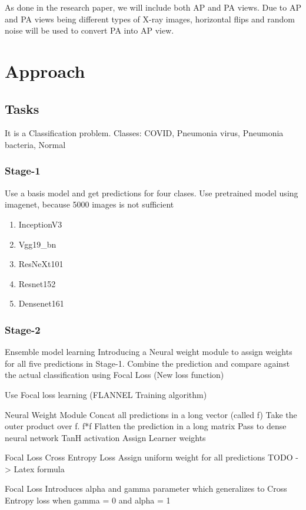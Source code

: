 \documentclass{sigkddExp}
\begin{document}
 As done in the research paper, we will include  both AP and PA views. Due to AP and PA views being different types of X-ray images, horizontal flips and random noise will be used to convert PA into AP view. 

\section{Approach}

\subsection{Tasks}
It is a Classification problem.
Classes: COVID, Pneumonia virus, Pneumonia bacteria, Normal
\subsubsection{Stage-1}
Use a basis model and get predictions for four clases. Use pretrained model using imagenet, because 5000 images is not sufficient 


\begin{enumerate}
       \item InceptionV3
       \item Vgg19\_bn
       \item ResNeXt101
       \item Resnet152
       \item Densenet161
\end{enumerate}


\subsubsection{Stage-2}

Ensemble model learning
Introducing a Neural weight module to assign weights for all five predictions in Stage-1.
Combine the prediction and compare against the actual classification using Focal Loss (New loss function)

Use Focal loss learning (FLANNEL Training algorithm)

Neural Weight Module
Concat all predictions in a long vector (called f)
Take the outer product over f. f*f
Flatten the prediction in a long matrix
Pass to dense neural network
TanH activation
Assign Learner weights

Focal Loss
Cross Entropy Loss
Assign uniform weight for all predictions
TODO -> Latex formula

Focal Loss
Introduces alpha and gamma parameter which generalizes to Cross Entropy loss when gamma = 0 and alpha = 1
\end{document}

